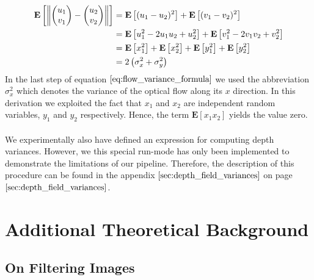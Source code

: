 \begin{equation}
\begin{aligned}
\mathbf{E} \left[ \norm{\colvec{u_1}{v_1} - \colvec{u_2}{v_2}} \right]
& = \mathbf{E} \left[ (u_1 - u_2)^2 \right] + \mathbf{E} \left[ (v_1 - v_2)^2 \right] \\
& = \mathbf{E} \left[ u_1^2 - 2 u_1 u_2 + u_2^2 \right] + \mathbf{E} \left[ v_1^2 - 2 v_1 v_2 + v_2^2 \right] \\
& = \mathbf{E} \left[ x_1^2 \right] + \mathbf{E} \left[ x_2^2 \right] + \mathbf{E} \left[ y_1^2 \right] + \mathbf{E} \left[ y_2^2 \right] \\
& = 2 \left( \sigma_x^2 + \sigma_y^2 \right)
\end{aligned}
\label{eq:flow_variance_formula}	
\end{equation}
In the last step of equation $\ref{eq:flow_variance_formula}$ we used the abbreviation $\sigma_x^2$ which denotes the variance of the optical flow along its $x$ direction. In this derivation we exploited the fact that $x_1$ and $x_2$ are independent random variables, $y_1$ and $y_2$ respectively. Hence, the term $\mathbf{E} \left[ x_1 x_2\right]$ yields the value zero. \\ \\
We experimentally also have defined an expression for computing depth variances. However, we this special run-mode has only been implemented to demonstrate the limitations of our pipeline. Therefore, the description of this procedure can be found in the appendix $\ref{sec:depth_field_variances}$ on page $\pageref{sec:depth_field_variances}$.

\chapter{Additional Theoretical Background}
\section{On Filtering Images}
